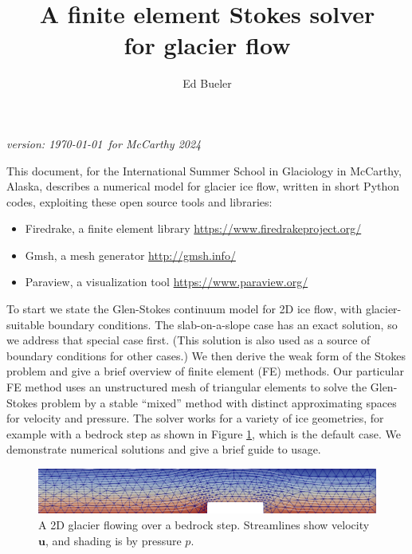 \documentclass[letterpaper,final,12pt,reqno]{amsart}
\newcommand{\bu}{\mathbf{u}}
\begin{document}
\graphicspath{{figures/}}

\title[FE Stokes solver for glacier flow]{A finite element Stokes solver \\ for glacier flow}

\author{Ed Bueler}

\maketitle

\vspace{-8mm}
\begin{center}
\footnotesize
\emph{version: \today~for McCarthy 2024}
\end{center}

\thispagestyle{empty}
\bigskip


This document, for the International Summer School in Glaciology in McCarthy, Alaska, describes a numerical model for glacier ice flow, written in short Python codes, exploiting these open source tools and libraries:
\begin{itemize}
\item Firedrake, a finite element library \hfill \url{https://www.firedrakeproject.org/}
\item Gmsh, a mesh generator \hfill \url{http://gmsh.info/}
\item Paraview, a visualization tool \hfill \url{https://www.paraview.org/}
\end{itemize}
To start we state the Glen-Stokes continuum model for 2D ice flow, with glacier-suitable boundary conditions.  The slab-on-a-slope case has an exact solution, so we address that special case first.  (This solution is also used as a source of boundary conditions for other cases.)  We then derive the weak form of the Stokes problem and give a brief overview of finite element (FE) methods.  Our particular FE method uses an unstructured mesh of triangular elements to solve the Glen-Stokes problem by a stable ``mixed'' method with distinct approximating spaces for velocity and pressure.  The solver works for a variety of ice geometries, for example with a bedrock step as shown in Figure \ref{fig:glacier:bedstep}, which is the default case.  We demonstrate numerical solutions and give a brief guide to usage.

\medskip
\begin{figure}[h]
\includegraphics[width=\textwidth,angle=-3.0]{stepflowlin}  %
\caption{A 2D glacier flowing over a bedrock step.  Streamlines show velocity $\bu$, and shading is by pressure $p$.}
\label{fig:glacier:bedstep}
\end{figure}
\end{document}
